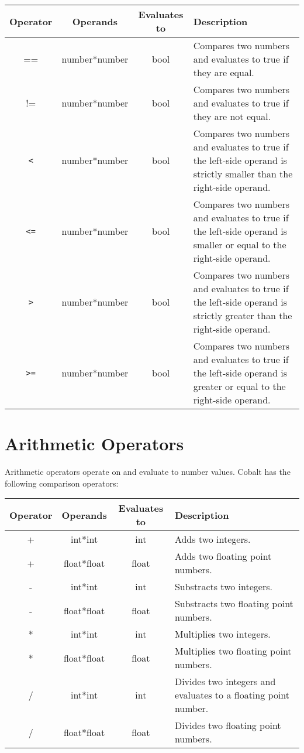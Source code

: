 \documentclass[a4paper,appendixprefix]{scrreprt}
\begin{document}
\begin{center}
  \begin{tabularx}{\textwidth}{|c|c|c|X|}
    \hline
    \textbf{Operator} & \textbf{Operands} & \textbf{Evaluates to} & \textbf{Description} \\ \hline
    == & number*number & bool & Compares two numbers and evaluates to true if they are equal. \\ \hline
    != & number*number & bool & Compares two numbers and evaluates to true if they are not equal. \\ \hline
    \verb|<| & number*number & bool & Compares two numbers and evaluates to true if the left-side operand is strictly smaller than the right-side operand. \\ \hline
    \verb|<=| & number*number & bool & Compares two numbers and evaluates to true if the left-side operand is smaller or equal to the right-side operand. \\ \hline
    \verb|>| & number*number & bool & Compares two numbers and evaluates to true if the left-side operand is strictly greater than the right-side operand. \\ \hline
    \verb|>=| & number*number & bool & Compares two numbers and evaluates to true if the left-side operand is greater or equal to the right-side operand. \\ \hline
  \end{tabularx}
\end{center}

\pagebreak

\section{Arithmetic Operators}
Arithmetic operators operate on and evaluate to number values. Cobalt has the following comparison operators:

\begin{center}
  \begin{tabularx}{\textwidth}{|c|c|c|X|}
    \hline
    \textbf{Operator} & \textbf{Operands} & \textbf{Evaluates to} & \textbf{Description} \\ \hline
    + & int*int & int & Adds two integers. \\ \hline
    + & float*float & float & Adds two floating point numbers. \\ \hline
    - & int*int & int & Substracts two integers. \\ \hline
    - & float*float & float & Substracts two floating point numbers. \\ \hline
    * & int*int & int & Multiplies two integers. \\ \hline
    * & float*float & float & Multiplies two floating point numbers. \\ \hline
    / & int*int & int & Divides two integers and evaluates to a floating point number. \\ \hline
    / & float*float & float & Divides two floating point numbers. \\ \hline
  \end{tabularx}
\end{center}
\end{document}
